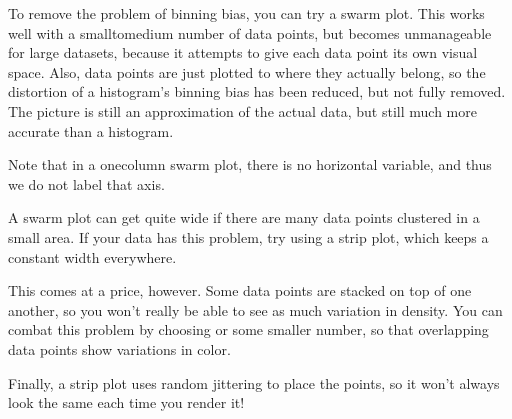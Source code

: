 \documentclass[letterpaper,10pt,english]{jupyterBook}
\begin{document}
\sphinxAtStartPar
To remove the problem of binning bias, you can try a swarm plot.  This works well with a small\sphinxhyphen{}to\sphinxhyphen{}medium number of data points, but becomes unmanageable for large datasets, because it attempts to give each data point its own visual space.  Also, data points are just plotted  to where they actually belong, so the distortion of a histogram’s binning bias has been reduced, but not fully removed.  The picture is still an approximation of the actual data, but still much more accurate than a histogram.

\sphinxAtStartPar
Note that in a one\sphinxhyphen{}column swarm plot, there is no horizontal variable, and thus we do not label that axis.

\begin{sphinxVerbatim}[commandchars=\\\{\}]
   
  
\end{sphinxVerbatim}

\noindent{}

\sphinxAtStartPar
A swarm plot can get quite wide if there are many data points clustered in a small area.  If your data has this problem, try using a strip plot, which keeps a constant width everywhere.

\sphinxAtStartPar
This comes at a price, however.  Some data points are stacked on top of one another, so you won’t really be able to see as much variation in density.  You can combat this problem by choosing  or some smaller number, so that overlapping data points show variations in color.

\sphinxAtStartPar
Finally, a strip plot uses random jittering to place the points, so it won’t always look the same each time you render it!

\begin{sphinxVerbatim}[commandchars=\\\{\}]
   
  
\end{sphinxVerbatim}
\end{document}
